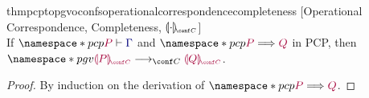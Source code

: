 \documentclass[main.tex]{subfiles}
\begin{document}
\begin{restatabletheorem}{thmpcptopgvoconfsoperationalcorrespondencecompleteness}%
  [Operational Correspondence, Completeness, $\cpgvC{\cdot}$]
  \label{thm:pcp-to-pgv-confs-operational-correspondence-completeness}
  \hfill\\%
  If $\pcp{\seq{P}{\ty{\Gamma}}}$ and $\pcp{\tm{P}\red\tm{Q}}$ in PCP,
  then $\pgv{\tm{\cpgvC{P}}\cred\tm{\cpgvC{Q}}}$.
\end{restatabletheorem}
\begin{proof}
  By induction on the derivation of $\pcp{\tm{P}\red\tm{Q}}$.
\end{proof}
\end{document}
